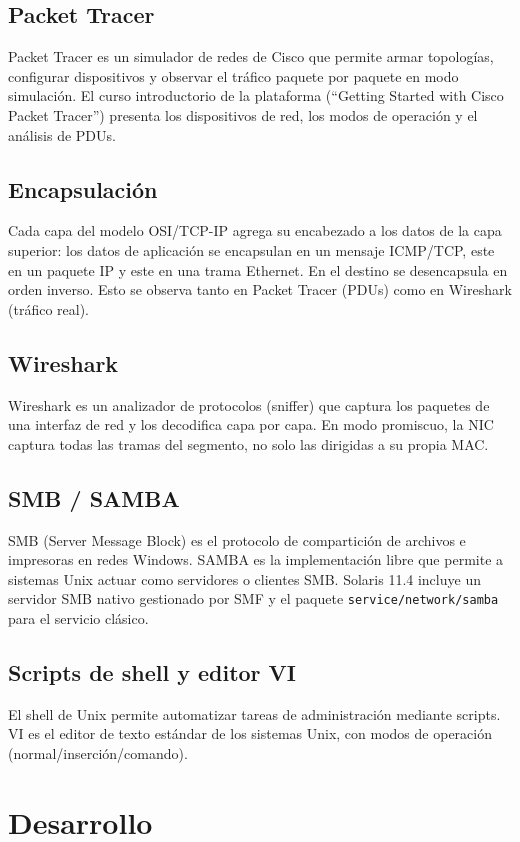 \subsection{Packet Tracer}
Packet Tracer es un simulador de redes de Cisco que permite armar topologías, configurar dispositivos y observar el tráfico paquete por paquete en modo simulación. El curso introductorio de la plataforma (``Getting Started with Cisco Packet Tracer'') presenta los dispositivos de red, los modos de operación y el análisis de PDUs.

\subsection{Encapsulación}
Cada capa del modelo OSI/TCP-IP agrega su encabezado a los datos de la capa superior: los datos de aplicación se encapsulan en un mensaje ICMP/TCP, este en un paquete IP y este en una trama Ethernet. En el destino se desencapsula en orden inverso. Esto se observa tanto en Packet Tracer (PDUs) como en Wireshark (tráfico real).

\subsection{Wireshark}
Wireshark es un analizador de protocolos (sniffer) que captura los paquetes de una interfaz de red y los decodifica capa por capa. En modo promiscuo, la NIC captura todas las tramas del segmento, no solo las dirigidas a su propia MAC.

\subsection{SMB / SAMBA}
SMB (Server Message Block) es el protocolo de compartición de archivos e impresoras en redes Windows. SAMBA es la implementación libre que permite a sistemas Unix actuar como servidores o clientes SMB. Solaris 11.4 incluye un servidor SMB nativo gestionado por SMF y el paquete \texttt{service/network/samba} para el servicio clásico.

\subsection{Scripts de shell y editor VI}
El shell de Unix permite automatizar tareas de administración mediante scripts. VI es el editor de texto estándar de los sistemas Unix, con modos de operación (normal/inserción/comando).

\section{Desarrollo}

